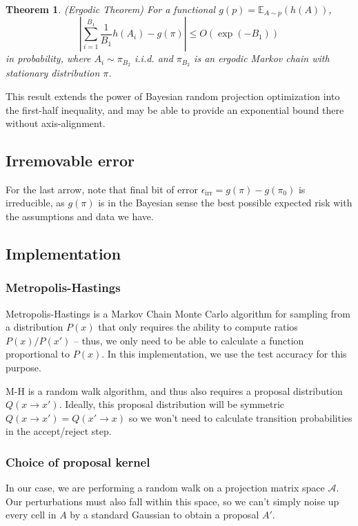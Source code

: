 \documentclass[ejs,preprint]{imsart}
\newtheorem{theorem}{Theorem}
\newcommand\E{\mathbb{E}}
\begin{document}
\begin{theorem}
(Ergodic Theorem) For a functional $g(p)=\E_{A\sim p}(h(A))$, 
\[
\left|\sum_{i=1}^{B_1}\frac{1}{B_1} h(A_i)-g(\pi)\right|\leq O(\exp(-B_1))
\]
in probability, where $A_i\sim\pi_{B_2}$ i.i.d. and $\pi_{B_2}$ is an ergodic Markov chain with stationary distribution $\pi$.
\end{theorem}

This result extends the power of Bayesian random projection optimization into the first-half inequality, and may be able to provide an exponential bound there without axis-alignment.

\subsection{Irremovable error}

For the last arrow, note that final bit of error $\epsilon_\mathrm{irr} = g(\pi)-g(\pi_0)$ is irreducible, as $g(\pi)$ is in the Bayesian sense the best possible expected risk with the assumptions and data we have.

\subsection{Implementation}

\subsubsection{Metropolis-Hastings}

Metropolis-Hastings \cite{MRRTT53} is a Markov Chain Monte Carlo algorithm for sampling from a distribution $P(x)$ that only requires the ability to compute ratios $P(x)/P(x')$ -- thus, we only need to be able to calculate a function proportional to $P(x)$. In this implementation, we use the test accuracy for this purpose.

M-H is a random walk algorithm, and thus also requires a proposal distribution $Q(x\to x')$. Ideally, this proposal distribution will be symmetric $Q(x\to x')=Q(x'\to x)$ so we won't need to calculate transition probabilities in the accept/reject step.

\subsubsection{Choice of proposal kernel}

In our case, we are performing a random walk on a projection matrix space $\mathcal A$. Our perturbations must also fall within this space, so we can't simply noise up every cell in $A$ by a standard Gaussian to obtain a proposal $A'$.
\end{document}
